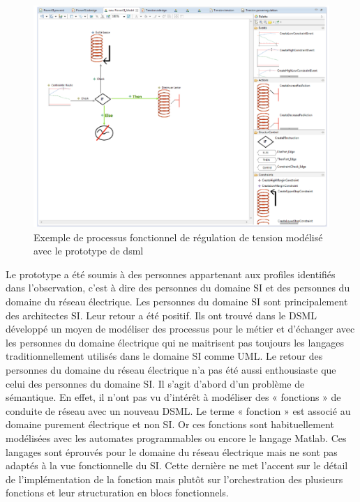 \begin{figure}[!ht]
 \begin{center}
  \includegraphics[trim = 0cm 0cm 0cm 0cm, width=1\textwidth]{figures/6_methodologie/proto_dsml.pdf}
 \end{center}
 \caption{Exemple de processus fonctionnel de régulation de tension modélisé avec le prototype de \gls{dsml}}
 \label{fig:proto_dsml}
\end{figure} 

Le prototype a été soumis à des personnes appartenant aux profiles identifiés dans l'observation, c'est à dire des personnes du domaine SI et des personnes du domaine du réseau électrique. Les personnes du domaine SI sont principalement des architectes SI. Leur retour a été positif. Ils ont trouvé dans le DSML développé un moyen de modéliser des processus pour le métier et d'échanger avec les personnes du domaine électrique qui ne maitrisent pas toujours les langages traditionnellement utilisés dans le domaine SI comme UML. Le retour des personnes du domaine du réseau électrique n'a pas été aussi enthousiaste que celui des personnes du domaine SI. Il s'agit d'abord d'un problème de sémantique. En effet, il n'ont pas vu d'intérêt à modéliser des « fonctions » de conduite de réseau avec un nouveau DSML. Le terme « fonction » est associé au domaine purement électrique et non SI. Or ces fonctions sont habituellement modélisées avec les automates programmables ou encore le langage Matlab. Ces langages sont éprouvés pour le domaine du réseau électrique mais ne sont pas adaptés à la vue fonctionnelle du SI. Cette dernière ne met l'accent sur le détail de l'implémentation de la fonction mais plutôt sur l'orchestration des plusieurs fonctions et leur structuration en blocs fonctionnels.

